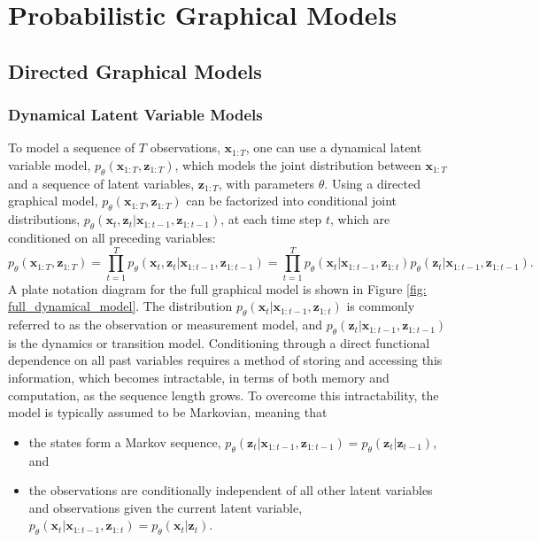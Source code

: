 \chapter{Probabilistic Graphical Models}
\label{chap: probabilistic graphical models}


\section{Directed Graphical Models}

\subsection{Dynamical Latent Variable Models}
\label{sec: dynamical latent variable models}

To model a sequence of $T$ observations, $\mathbf{x}_{1:T}$, one can use a dynamical latent variable model, $p_\theta (\mathbf{x}_{1:T}, \mathbf{z}_{1:T})$, which models the joint distribution between $\mathbf{x}_{1:T}$ and a sequence of latent variables, $\mathbf{z}_{1:T}$, with parameters $\theta$. Using a directed graphical model, $p_\theta (\mathbf{x}_{1:T}, \mathbf{z}_{1:T})$ can be factorized into conditional joint distributions, $p_\theta (\mathbf{x}_t, \mathbf{z}_t | \mathbf{x}_{1:t-1}, \mathbf{z}_{1:t-1})$, at each time step $t$, which are conditioned on all preceding variables:
\begin{equation}
    p_\theta (\mathbf{x}_{1:T}, \mathbf{z}_{1:T}) = \prod_{t=1}^T p_\theta (\mathbf{x}_t, \mathbf{z}_t | \mathbf{x}_{1:t-1}, \mathbf{z}_{1:t-1}) = \prod_{t=1}^T p_\theta (\mathbf{x}_t | \mathbf{x}_{1:t-1}, \mathbf{z}_{1:t}) p_\theta (\mathbf{z}_t | \mathbf{x}_{1:t-1}, \mathbf{z}_{1:t-1}).
    \label{eq: general dynamics model}
\end{equation}
A plate notation diagram for the full graphical model is shown in Figure \ref{fig: full_dynamical_model}. The distribution $p_\theta (\mathbf{x}_t | \mathbf{x}_{1:t-1}, \mathbf{z}_{1:t})$ is commonly referred to as the observation or measurement model, and $p_\theta (\mathbf{z}_t | \mathbf{x}_{1:t-1}, \mathbf{z}_{1:t-1})$ is the dynamics or transition model. Conditioning through a direct functional dependence on all past variables requires a method of storing and accessing this information, which becomes intractable, in terms of both memory and computation, as the sequence length grows. To overcome this intractability, the model is typically assumed to be Markovian, meaning that
\begin{itemize}
    \item the states form a Markov sequence, $p_\theta (\mathbf{z}_t | \mathbf{x}_{1:t-1}, \mathbf{z}_{1:t-1}) = p_\theta (\mathbf{z}_t | \mathbf{z}_{t-1}) $, and
    \item the observations are conditionally independent of all other latent variables and observations given the current latent variable, $p_\theta (\mathbf{x}_t | \mathbf{x}_{1:t-1}, \mathbf{z}_{1:t}) = p_\theta (\mathbf{x}_t | \mathbf{z}_t)$.
\end{itemize}
